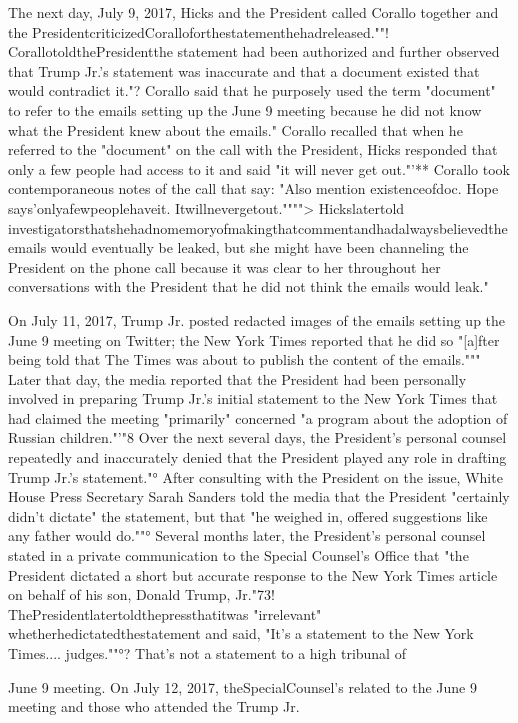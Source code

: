 The next day, July 9, 2017, Hicks and the President called Corallo together and the PresidentcriticizedCoralloforthestatementhehadreleased.""!
CorallotoldthePresidentthe statement had been authorized and further observed that Trump Jr.'s statement was inaccurate and that a document existed that would contradict it."?
Corallo said that he purposely used the term "document" to refer to the emails setting up the June 9 meeting because he did not know what the President knew about the emails."
Corallo recalled that when he referred to the "document" on the call with the President, Hicks responded that only a few people had access to it and said "it will never get out."'**
Corallo took contemporaneous notes of the call that say: "Also mention existenceofdoc.
Hope says'onlyafewpeoplehaveit.
Itwillnevergetout."""">
Hickslatertold investigatorsthatshehadnomemoryofmakingthatcommentandhadalwaysbelievedtheemails would eventually be leaked, but she might have been channeling the President on the phone call because it was clear to her throughout her conversations with the President that he did not think the emails would leak."

On July 11, 2017, Trump Jr. posted redacted images of the emails setting up the June 9 meeting on Twitter; the New York Times reported that he did so "[a]fter being told that The Times was about to publish the content of the emails."""
Later that day, the media reported that the President had been personally involved in preparing Trump Jr.'s initial statement to the New York Times that had claimed the meeting "primarily" concerned "a program about the adoption of Russian children."'"8
Over the next several days, the President's personal counsel repeatedly and inaccurately denied that the President played any role in drafting Trump Jr.'s statement."°
After consulting with the President on the issue, White House Press Secretary Sarah Sanders told the media that the President "certainly didn't dictate" the statement, but that "he weighed in, offered suggestions like any father would do.""°
Several months later, the President's personal counsel stated in a private communication to the Special Counsel's Office that "the President dictated a short but accurate response to the New York Times article on behalf of his son, Donald Trump,
Jr."73!
ThePresidentlatertoldthepressthatitwas "irrelevant" whetherhedictatedthestatement
and said, "It's a statement to the New York Times.... judges.""°?
That's not a statement to a high tribunal of

June 9 meeting.
On July 12, 2017, theSpecialCounsel's
related to the June 9 meeting and those who attended the
Trump Jr.

